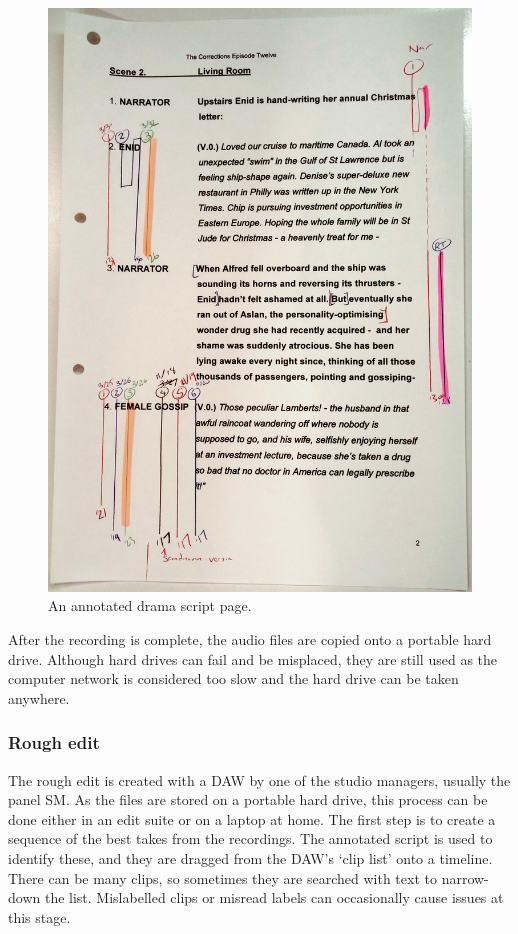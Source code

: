 \begin{figure}[p]
  \centering
  \includegraphics[width=\columnwidth]{figs/drama-script-example-processed.jpg}
  \caption{An annotated drama script page.}
  \label{fig:drama-script}
\end{figure}

After the recording is complete, the audio files are copied onto a portable
hard drive. Although hard drives can fail and be misplaced, they are still used
as the computer network is considered too slow and the hard drive can be taken
anywhere.

\subsubsection{Rough edit}
The rough edit is created with a DAW by one of the studio managers, usually the
panel SM. As the files are stored on a portable hard drive, this process can be
done either in an edit suite or on a laptop at home. The first step is to
create a sequence of the best takes from the recordings. The annotated script
is used to identify these, and they are dragged from the DAW's `clip list' onto
a timeline. There can be many clips, so sometimes they are searched with text
to narrow-down the list. Mislabelled clips or misread labels can occasionally
cause issues at this stage.

